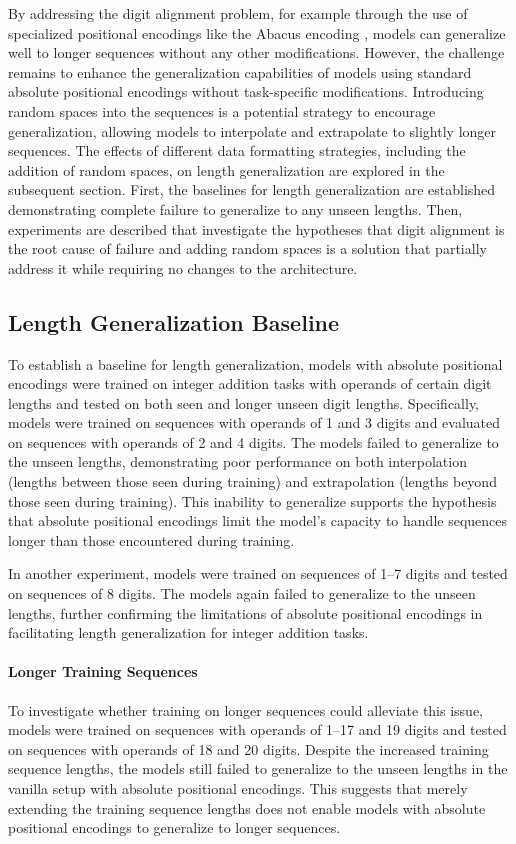 By addressing the digit alignment problem, for example through the use of specialized positional encodings like the Abacus encoding \parencite{mcleish_transformers_2024}, models can generalize well to longer sequences without any other modifications. However, the challenge remains to enhance the generalization capabilities of models using standard absolute positional encodings without task-specific modifications. Introducing random spaces into the sequences is a potential strategy to encourage generalization, allowing models to interpolate and extrapolate to slightly longer sequences. The effects of different data formatting strategies, including the addition of random spaces, on length generalization are explored in the subsequent section. First, the baselines for length generalization are established demonstrating complete failure to generalize to any unseen lengths. Then, experiments are described that investigate the hypotheses that digit alignment is the root cause of failure and adding random spaces is a solution that partially address it while requiring no changes to the architecture.

\subsection{Length Generalization Baseline}\label{subsec:length_generalization_baseline}

To establish a baseline for length generalization, models with absolute positional encodings were trained on integer addition tasks with operands of certain digit lengths and tested on both seen and longer unseen digit lengths. Specifically, models were trained on sequences with operands of 1 and 3 digits and evaluated on sequences with operands of 2 and 4 digits. The models failed to generalize to the unseen lengths, demonstrating poor performance on both interpolation (lengths between those seen during training) and extrapolation (lengths beyond those seen during training). This inability to generalize supports the hypothesis that absolute positional encodings limit the model's capacity to handle sequences longer than those encountered during training.

In another experiment, models were trained on sequences of 1--7 digits and tested on sequences of 8 digits. The models again failed to generalize to the unseen lengths, further confirming the limitations of absolute positional encodings in facilitating length generalization for integer addition tasks.

\paragraph{Longer Training Sequences}
To investigate whether training on longer sequences could alleviate this issue, models were trained on sequences with operands of 1--17 and 19 digits and tested on sequences with operands of 18 and 20 digits. Despite the increased training sequence lengths, the models still failed to generalize to the unseen lengths in the vanilla setup with absolute positional encodings. This suggests that merely extending the training sequence lengths does not enable models with absolute positional encodings to generalize to longer sequences.

